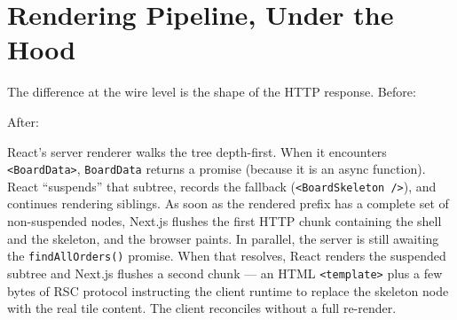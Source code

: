 \documentclass[11pt]{article}
\begin{document}
\section{Rendering Pipeline, Under the Hood}

The difference at the wire level is the shape of the HTTP response. Before:

\begin{center}
\end{center}

After:

\begin{center}
\end{center}

React's server renderer walks the tree depth-first. When it encounters \texttt{<BoardData>}, \texttt{BoardData} returns a promise (because it is an async function). React ``suspends'' that subtree, records the fallback (\texttt{<BoardSkeleton />}), and continues rendering siblings. As soon as the rendered prefix has a complete set of non-suspended nodes, Next.js flushes the first HTTP chunk containing the shell and the skeleton, and the browser paints. In parallel, the server is still awaiting the \texttt{findAllOrders()} promise. When that resolves, React renders the suspended subtree and Next.js flushes a second chunk --- an HTML \texttt{<template>} plus a few bytes of RSC protocol instructing the client runtime to replace the skeleton node with the real tile content. The client reconciles without a full re-render.
\end{document}
